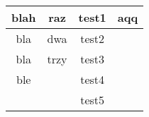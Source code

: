 \documentclass{article}
\begin{document}
\begin{tabular}{|c|c|c|c|}\hline
blah & raz & test1 & aqq
\\
\hline
bla & dwa & test2 & \\
\hline
bla & trzy
 & test3 & \\
\hline
ble
 &  & test4 & \\
\hline
 &  & test5
 & \\
\hline
\end{tabular}
\end{document}

